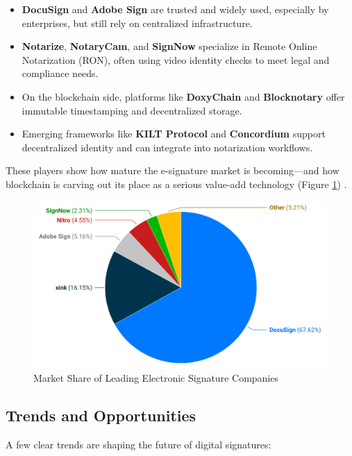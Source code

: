 \begin{itemize}
    \item \textbf{DocuSign} and \textbf{Adobe Sign} are trusted and widely used, especially by enterprises, but still rely on centralized infrastructure.
    \item \textbf{Notarize}, \textbf{NotaryCam}, and \textbf{SignNow} specialize in Remote Online Notarization (RON), often using video identity checks to meet legal and compliance needs.
    \item On the blockchain side, platforms like \textbf{DoxyChain} and \textbf{Blocknotary} offer immutable timestamping and decentralized storage.
    \item Emerging frameworks like \textbf{KILT Protocol} and \textbf{Concordium} support decentralized identity and can integrate into notarization workflows.
\end{itemize}

These players show how mature the e-signature market is becoming—and how blockchain is carving out its place as a serious value-add technology (Figure \ref{market-share}) \cite{electro_iq_e-signature_nodate}.

\begin{figure}[H]
    \centering
    \includegraphics[width=18cm]{images/market-share.png}
    \caption{Market Share of Leading Electronic Signature Companies}
    \label{market-share}
\end{figure}

\subsection{Trends and Opportunities}
A few clear trends are shaping the future of digital signatures:

